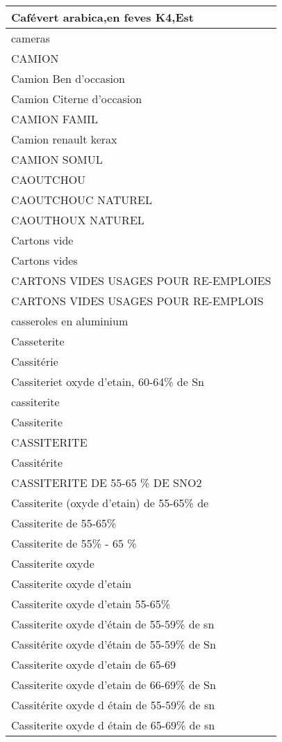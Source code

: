 \documentclass[
]{book}
\begin{document}
\begin{table}
\begin{tabular}[t]{l}
\hline
Cafévert arabica,en feves K4,Est\\
\hline
cameras\\
\hline
CAMION\\
\hline
Camion Ben d'occasion\\
\hline
Camion Citerne d'occasion\\
\hline
CAMION FAMIL\\
\hline
Camion renault kerax\\
\hline
CAMION SOMUL\\
\hline
CAOUTCHOU\\
\hline
CAOUTCHOUC NATUREL\\
\hline
CAOUTHOUX NATUREL\\
\hline
Cartons vide\\
\hline
Cartons vides\\
\hline
CARTONS VIDES USAGES POUR RE-EMPLOIES\\
\hline
CARTONS VIDES USAGES POUR RE-EMPLOIS\\
\hline
casseroles en aluminium\\
\hline
Casseterite\\
\hline
Cassitérie\\
\hline
Cassiteriet oxyde d'etain, 60-64\% de Sn\\
\hline
cassiterite\\
\hline
Cassiterite\\
\hline
CASSITERITE\\
\hline
Cassitérite\\
\hline
CASSITERITE  DE 55-65 \% DE SNO2\\
\hline
Cassiterite (oxyde d'etain) de 55-65\% de\\
\hline
Cassiterite de 55-65\%\\
\hline
Cassiterite de 55\% - 65 \%\\
\hline
Cassiterite oxyde\\
\hline
Cassiterite oxyde d'etain\\
\hline
Cassiterite oxyde d'etain 55-65\%\\
\hline
Cassiterite oxyde d'étain de 55-59\% de sn\\
\hline
Cassitérite oxyde d'étain de 55-59\% de Sn\\
\hline
Cassiterite oxyde d'etain de 65-69\\
\hline
Cassiterite oxyde d'etain de 66-69\% de Sn\\
\hline
Cassitérite oxyde d étain de 55-59\% de sn\\
\hline
Cassiterite oxyde d étain de 65-69\% de sn\\

\end{tabular}
\end{table}
\end{document}
